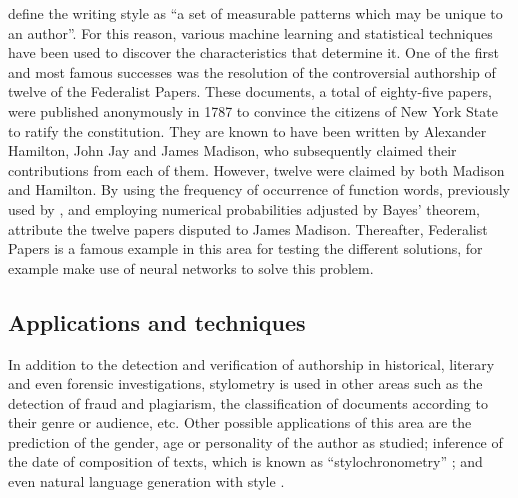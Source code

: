 \cite{neuronalstylometry} define the writing style as ``a set of measurable patterns which may be unique to an author''. For this reason, various machine learning and statistical techniques have been used to discover the characteristics that determine it. One of the first and most famous successes was the resolution of the controversial authorship of twelve of the Federalist Papers. These documents, a total of eighty-five papers, were published anonymously in 1787 to convince the citizens of New York State to ratify the constitution. They are known to have been written by Alexander Hamilton, John Jay and James Madison, who subsequently claimed their contributions from each of them. However, twelve were claimed by both Madison and Hamilton. By using the frequency of occurrence of function words, previously used by \cite{juniusletters}, and employing numerical probabilities adjusted by Bayes' theorem, \cite{federalistpapers} attribute the twelve papers disputed to James Madison. Thereafter, Federalist Papers is a famous example in this area for testing the different solutions, for example \cite{neuronalstylometry} make use of neural networks to solve this problem.

\subsection{Applications and techniques}\label{ssect:techstylo}
In addition to the detection and verification of authorship in historical, literary and even forensic investigations, stylometry is used in other areas such as the detection of fraud and plagiarism, the classification of documents according to their genre or audience, etc. Other possible applications of this area are the prediction of the gender, age or personality of the author as \cite{schwartz2013personality} studied; inference of the date of composition of texts, which is known as ``stylochronometry'' \citep{stamou2007stylochronometry, juola2007becoming}; and even natural language generation with style \citep[Section 5.1]{nlgsoa}.

